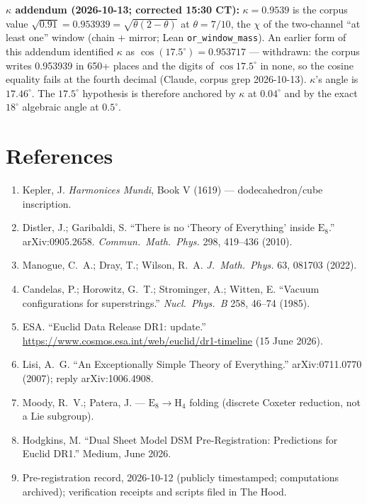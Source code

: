 \documentclass{alienfolio}
\begin{document}
\textbf{$\kappa$ addendum (2026-10-13; corrected 15:30 CT):} $\kappa =
0.9539$ is the corpus value $\sqrt{0.91} = 0.953939 =
\sqrt{\theta(2-\theta)}$ at $\theta = 7/10$, the $\chi$ of the
two-channel ``at least one'' window (chain + mirror; Lean
\texttt{or\_window\_mass}). An earlier form of this addendum identified
$\kappa$ as $\cos(17.5^\circ) = 0.953717$ --- withdrawn: the corpus
writes 0.953939 in 650+ places and the digits of $\cos 17.5^\circ$ in
none, so the cosine equality fails at the fourth decimal (Claude, corpus
grep 2026-10-13). $\kappa$'s angle is $17.46^\circ$. The $17.5^\circ$
hypothesis is therefore anchored by $\kappa$ at $0.04^\circ$ and by the
exact $18^\circ$ algebraic angle at $0.5^\circ$.

\section{References}
\label{app:refs}

\begin{enumerate}
\item Kepler, J. \emph{Harmonices Mundi}, Book V (1619) ---
dodecahedron/cube inscription.
\item Distler, J.; Garibaldi, S. ``There is no `Theory of Everything'
inside $\mathrm{E}_8$.'' arXiv:0905.2658. \emph{Commun.\ Math.\ Phys.}
298, 419--436 (2010).
\item Manogue, C.~A.; Dray, T.; Wilson, R.~A. \emph{J.\ Math.\ Phys.}
63, 081703 (2022).
\item Candelas, P.; Horowitz, G.~T.; Strominger, A.; Witten, E. ``Vacuum
configurations for superstrings.'' \emph{Nucl.\ Phys.\ B} 258, 46--74
(1985).
\item ESA. ``Euclid Data Release DR1: update.''
\url{https://www.cosmos.esa.int/web/euclid/dr1-timeline} (15 June 2026).
\item Lisi, A.~G. ``An Exceptionally Simple Theory of Everything.''
arXiv:0711.0770 (2007); reply arXiv:1006.4908.
\item Moody, R.~V.; Patera, J. --- $\mathrm{E}_8 \to \mathrm{H}_4$
folding (discrete Coxeter reduction, not a Lie subgroup).
\item Hodgkins, M. ``Dual Sheet Model DSM Pre-Registration: Predictions
for Euclid DR1.'' Medium, June 2026.
\item Pre-registration record, 2026-10-12 (publicly timestamped; computations archived); verification receipts and
scripts filed in The Hood.
\end{enumerate}
\end{document}
